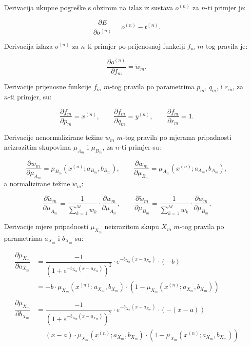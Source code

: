 \documentclass[12pt, a4paper]{article}
\begin{document}
Derivacija ukupne pogreške s obzirom na izlaz iz sustava $o^{(n)}$ za $n$-ti primjer je:

$$ \dfrac{\partial E}{\partial o^{(n)}} = o^{(n)} - t^{(n)}. $$

Derivacija izlaza $o^{(n)}$ za $n$-ti primjer po prijenosnoj funkciji $f_m$ $m$-tog pravila je:

$$ \dfrac{\partial o^{(n)}}{\partial f_m} = \widetilde{w}_m. $$

Derivacije prijenosne funkcije $f_m$ $m$-tog pravila po parametrima $p_m$, $q_m$, i $r_m$, za $n$-ti primjer, su:

$$
  \dfrac{\partial f_m}{\partial p_m} = x^{(n)}, \qquad
  \dfrac{\partial f_m}{\partial q_m} = y^{(n)}, \qquad
  \dfrac{\partial f_m}{\partial r_m} = 1.
$$

Derivacije nenormalizirane težine $w_m$ $m$-tog pravila po mjerama pripadnosti neizrazitim skupovima $\mu_{A_m}$ i $\mu_{B_m}$, za $n$-ti primjer su:

$$
  \dfrac{\partial w_m}{\partial \mu_{A_m}}
  = \mu_{B_m} \left( x^{(n)}; a_{B_m}, b_{B_m} \right), \qquad
  \dfrac{\partial w_m}{\partial \mu_{B_m}}
  = \mu_{A_m} \left( x^{(n)}; a_{A_m}, b_{A_m} \right),
$$
a normalizirane težine $\widetilde{w}_m$:

$$
  \dfrac{\partial \widetilde{w}_m}{\partial \mu_{A_m}}
  = \dfrac{1}{\sum_{k=1}^{M} w_k} \cdot
    \dfrac{\partial w_m}{\partial \mu_{A_m}}, \qquad
  \dfrac{\partial \widetilde{w}_m}{\partial \mu_{B_m}}
    = \dfrac{1}{\sum_{k=1}^{M} w_k} \cdot
    \dfrac{\partial w_m}{\partial \mu_{B_m}}.
$$

Derivacije mjere pripadnosti $\mu_{X_m}$ neizrazitom skupu $X_m$ $m$-tog pravila po parametrima $a_{X_m}$ i $b_{X_m}$ su:

\begin{align*}
  \dfrac{\partial \mu_{X_m}}{\partial a_{X_m}}
  &= \dfrac{-1}{\left( 1 + e^{-b_{X_m}\left( x - a_{X_m} \right)} \right)^2} \cdot
    e^{-b_{X_m}\left( x - a_{X_m} \right)} \cdot (-b) \\
  &= -b \cdot \mu_{X_m} \left( x^{(n)}; a_{X_m}, b_{X_m} \right) \cdot \left( 1 - \mu_{X_m} \left( x^{(n)}; a_{X_m}, b_{X_m} \right) \right) \\ \\
  \dfrac{\partial \mu_{X_m}}{\partial b_{X_m}}
  &= \dfrac{-1}{\left( 1 + e^{-b_{X_m}\left( x - a_{X_m} \right)} \right)^2} \cdot
  e^{-b_{X_m}\left( x - a_{X_m} \right)} \cdot (-(x - a)) \\
  &= (x - a) \cdot \mu_{X_m} \left( x^{(n)}; a_{X_m}, b_{X_m} \right) \cdot \left( 1 - \mu_{X_m} \left( x^{(n)}; a_{X_m}, b_{X_m} \right) \right)
\end{align*}
\end{document}
